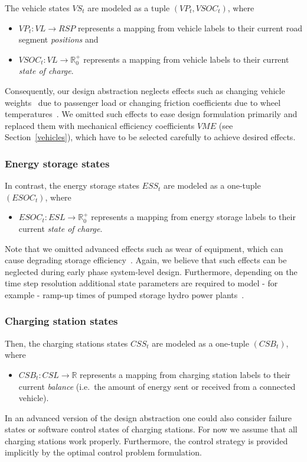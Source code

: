 The vehicle states $VS_t$ are modeled as a tuple $(VP_t, VSOC_t)$, where
\begin{itemize}
	\item $VP_t: VL \rightarrow RSP$ represents a mapping from vehicle labels to their current road segment \textit{positions} and
	\item $VSOC_t: VL \rightarrow \mathbb{R}_0^+$ represents a mapping from vehicle labels to their current \textit{state of charge}.
\end{itemize}
Consequently, our design abstraction neglects effects such as changing vehicle weights~\cite{?} due to passenger load or changing friction coefficients due to wheel temperatures~\cite{?}. We omitted such effects to ease design formulation primarily and replaced them with mechanical efficiency coefficients $VME$ (see Section~\ref{vehicles}), which have to be selected carefully to achieve desired effects.

\subsubsection{Energy storage states}
\label{states_storages}

In contrast, the energy storage states $ESS_t$ are modeled as a one-tuple $(ESOC_t)$, where
\begin{itemize}
	\item $ESOC_t: ESL \rightarrow \mathbb{R}_0^+$ represents a mapping from energy storage labels to their current \textit{state of charge}. 
\end{itemize}
Note that we omitted advanced effects such as wear of equipment, which can cause degrading storage efficiency~\cite{?}. Again, we believe that such effects can be neglected during early phase system-level design. Furthermore, depending on the time step resolution additional state parameters are required to model - for example - ramp-up times of pumped storage hydro power plants~\cite{Garcia2008}.

\subsubsection{Charging station states}
\label{states_stations}

Then, the charging stations states $CSS_t$ are modeled as a one-tuple $(CSB_t)$, where
\begin{itemize}
	\item $CSB_t: CSL \rightarrow \mathbb{R}$ represents a mapping from charging station labels to their current \textit{balance} (i.e.\ the amount of energy sent or received from a connected vehicle).
\end{itemize}
In an advanced version of the design abstraction one could also consider failure states or software control states of charging stations. For now we assume that all charging stations work properly. Furthermore, the control strategy is provided implicitly by the optimal control problem formulation.

